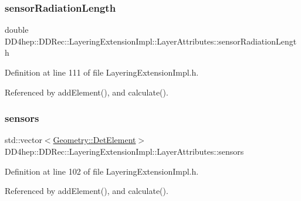 \subsubsection{\texorpdfstring{sensor\+Radiation\+Length}{sensorRadiationLength}}
{\footnotesize\ttfamily double D\+D4hep\+::\+D\+D\+Rec\+::\+Layering\+Extension\+Impl\+::\+Layer\+Attributes\+::sensor\+Radiation\+Length}



Definition at line 111 of file Layering\+Extension\+Impl.\+h.



Referenced by add\+Element(), and calculate().

\hypertarget{struct_d_d4hep_1_1_d_d_rec_1_1_layering_extension_impl_1_1_layer_attributes_ae2f7cbcf5fd427fc4655bf769003909a}{}\label{struct_d_d4hep_1_1_d_d_rec_1_1_layering_extension_impl_1_1_layer_attributes_ae2f7cbcf5fd427fc4655bf769003909a} 
\subsubsection{\texorpdfstring{sensors}{sensors}}
{\footnotesize\ttfamily std\+::vector$<$\hyperlink{class_d_d4hep_1_1_geometry_1_1_det_element}{Geometry\+::\+Det\+Element}$>$ D\+D4hep\+::\+D\+D\+Rec\+::\+Layering\+Extension\+Impl\+::\+Layer\+Attributes\+::sensors}



Definition at line 102 of file Layering\+Extension\+Impl.\+h.



Referenced by add\+Element(), and calculate().

\hypertarget{struct_d_d4hep_1_1_d_d_rec_1_1_layering_extension_impl_1_1_layer_attributes_a7d63afe728d3ef686cc9130188abce0e}{}\label{struct_d_d4hep_1_1_d_d_rec_1_1_layering_extension_impl_1_1_layer_attributes_a7d63afe728d3ef686cc9130188abce0e} 
